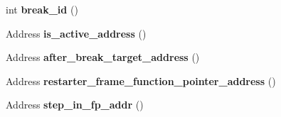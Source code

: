 \begin{DoxyCompactItemize}
\item 
\hypertarget{classv8_1_1internal_1_1_debug_ab5d835a2fc440cf4695c03f0cca6c969}{}int {\bfseries break\+\_\+id} ()\label{classv8_1_1internal_1_1_debug_ab5d835a2fc440cf4695c03f0cca6c969}

\item 
\hypertarget{classv8_1_1internal_1_1_debug_a77b55241314326418891e2f890dd5718}{}Address {\bfseries is\+\_\+active\+\_\+address} ()\label{classv8_1_1internal_1_1_debug_a77b55241314326418891e2f890dd5718}

\item 
\hypertarget{classv8_1_1internal_1_1_debug_aca4cb431f84d131c6f54c86d9ba6a353}{}Address {\bfseries after\+\_\+break\+\_\+target\+\_\+address} ()\label{classv8_1_1internal_1_1_debug_aca4cb431f84d131c6f54c86d9ba6a353}

\item 
\hypertarget{classv8_1_1internal_1_1_debug_a88eb6801f8d385dfd34575777d382c8f}{}Address {\bfseries restarter\+\_\+frame\+\_\+function\+\_\+pointer\+\_\+address} ()\label{classv8_1_1internal_1_1_debug_a88eb6801f8d385dfd34575777d382c8f}

\item 
\hypertarget{classv8_1_1internal_1_1_debug_a5d45b3267015bfa02233d101907af2e6}{}Address {\bfseries step\+\_\+in\+\_\+fp\+\_\+addr} ()\label{classv8_1_1internal_1_1_debug_a5d45b3267015bfa02233d101907af2e6}

\end{DoxyCompactItemize}
